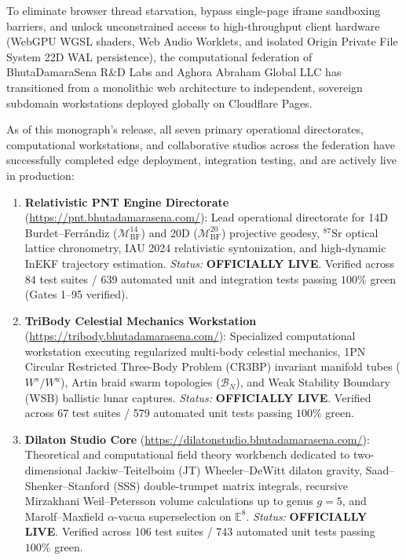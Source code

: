\documentclass[11pt,a4paper,reqno]{article}
\theoremstyle{plain}
\theoremstyle{definition}
\theoremstyle{remark}
\numberwithin{equation}{section}
\begin{document}
To eliminate browser thread starvation, bypass single-page iframe sandboxing barriers, and unlock unconstrained access to high-throughput client hardware (WebGPU WGSL shaders, Web Audio Worklets, and isolated Origin Private File System 22D WAL persistence), the computational federation of BhutaDamaraSena R\&D Labs and Aghora Abraham Global LLC has transitioned from a monolithic web architecture to independent, sovereign subdomain workstations deployed globally on Cloudflare Pages.

As of this monograph's release, all seven primary operational directorates, computational workstations, and collaborative studios across the federation have successfully completed edge deployment, integration testing, and are actively live in production:
\begin{enumerate}[label=\textbf{(\arabic*)}, leftmargin=2.2em]
  \item \textbf{Relativistic PNT Engine Directorate} (\url{https://pnt.bhutadamarasena.com/}): 
  Lead operational directorate for 14D Burdet--Ferr\'{a}ndiz ($\mathcal{M}_{\mathrm{BF}}^{14}$) and 20D ($\mathcal{M}_{\mathrm{BF}}^{20}$) projective geodesy, $^{87}\text{Sr}$ optical lattice chronometry, IAU 2024 relativistic syntonization, and high-dynamic InEKF trajectory estimation. 
  \emph{Status:} \textbf{OFFICIALLY LIVE}. Verified across 84 test suites / 639 automated unit and integration tests passing $100\%$ green (Gates 1--95 verified).
  
  \item \textbf{TriBody Celestial Mechanics Workstation} (\url{https://tribody.bhutadamarasena.com/}): 
  Specialized computational workstation executing regularized multi-body celestial mechanics, 1PN Circular Restricted Three-Body Problem (CR3BP) invariant manifold tubes ($W^s / W^u$), Artin braid swarm topologies ($\mathcal{B}_N$), and Weak Stability Boundary (WSB) ballistic lunar captures. 
  \emph{Status:} \textbf{OFFICIALLY LIVE}. Verified across 67 test suites / 579 automated unit tests passing $100\%$ green.
  
  \item \textbf{Dilaton Studio Core} (\url{https://dilatonstudio.bhutadamarasena.com/}): 
  Theoretical and computational field theory workbench dedicated to two-dimensional Jackiw--Teitelboim (JT) Wheeler--DeWitt dilaton gravity, Saad--Shenker--Stanford (SSS) double-trumpet matrix integrals, recursive Mirzakhani Weil--Petersson volume calculations up to genus $g = 5$, and Marolf--Maxfield $\alpha$-vacua superselection on $\mathbb{E}^8$. 
  \emph{Status:} \textbf{OFFICIALLY LIVE}. Verified across 106 test suites / 743 automated unit tests passing $100\%$ green.
  

\end{enumerate}
\end{document}
